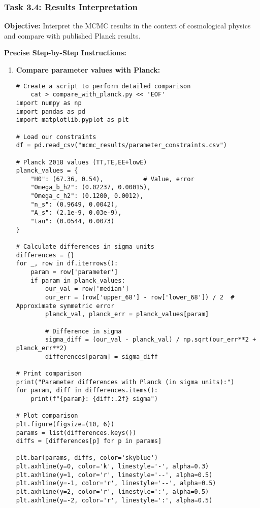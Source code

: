 \documentclass[11pt]{article}
\begin{document}
\subsubsection{Task 3.4: Results Interpretation}

\textbf{Objective:} Interpret the MCMC results in the context of cosmological physics and compare with published Planck results.

\textbf{Precise Step-by-Step Instructions:}

\begin{enumerate}
    \item \textbf{Compare parameter values with Planck:}
    \begin{lstlisting}[basicstyle=\small\ttfamily]
    # Create a script to perform detailed comparison
    cat > compare_with_planck.py << 'EOF'
import numpy as np
import pandas as pd
import matplotlib.pyplot as plt

# Load our constraints
df = pd.read_csv("mcmc_results/parameter_constraints.csv")

# Planck 2018 values (TT,TE,EE+lowE)
planck_values = {
    "H0": (67.36, 0.54),           # Value, error
    "Omega_b_h2": (0.02237, 0.00015),
    "Omega_c_h2": (0.1200, 0.0012),
    "n_s": (0.9649, 0.0042),
    "A_s": (2.1e-9, 0.03e-9),
    "tau": (0.0544, 0.0073)
}

# Calculate differences in sigma units
differences = {}
for _, row in df.iterrows():
    param = row['parameter']
    if param in planck_values:
        our_val = row['median']
        our_err = (row['upper_68'] - row['lower_68']) / 2  # Approximate symmetric error
        planck_val, planck_err = planck_values[param]
        
        # Difference in sigma
        sigma_diff = (our_val - planck_val) / np.sqrt(our_err**2 + planck_err**2)
        differences[param] = sigma_diff

# Print comparison
print("Parameter differences with Planck (in sigma units):")
for param, diff in differences.items():
    print(f"{param}: {diff:.2f} sigma")

# Plot comparison
plt.figure(figsize=(10, 6))
params = list(differences.keys())
diffs = [differences[p] for p in params]

plt.bar(params, diffs, color='skyblue')
plt.axhline(y=0, color='k', linestyle='-', alpha=0.3)
plt.axhline(y=1, color='r', linestyle='--', alpha=0.5)
plt.axhline(y=-1, color='r', linestyle='--', alpha=0.5)
plt.axhline(y=2, color='r', linestyle=':', alpha=0.5)
plt.axhline(y=-2, color='r', linestyle=':', alpha=0.5)


\end{lstlisting}
\end{enumerate}
\end{document}
